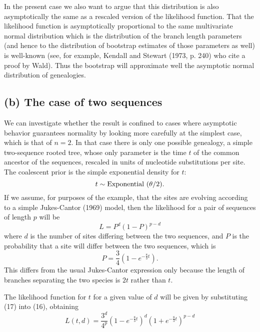 In the present case we also want to argue that this distribution is also
asymptotically the same as a rescaled version of the likelihood function.
That the likelihood function is asymptotically proportional to the same
multivariate normal distribution which is the distribution of the branch length
parameters (and hence to the distribution of bootstrap estimates of those
parameters as well) is well-known (see, for example, Kendall and Stewart
(1973, p. 240) who cite a proof by Wald).  Thus the bootstrap will
approximate well the asymptotic normal distribution of genealogies.

\subsection*{(b) The case of two sequences}

We can investigate whether the result is confined to cases where
asymptotic behavior guarantees normality by looking more carefully
at the simplest case, which is that of $n = 2$.  In that case there is
only one possible genealogy, a simple two-sequence rooted tree, whose
only parameter is the time $t$ of the common ancestor of the sequences,
rescaled in units of nucleotide substitutions per site.
The coalescent prior is the simple exponential density for $t$:
\begin{equation} %
t \sim {\rm Exponential}~(\theta/2).
\end{equation}
If we assume, for purposes of the example, that the sites are evolving
according to a simple Jukes-Cantor (1969) model, then the likelihood for
a pair of sequences of length $p$ will be 
\begin{equation} %
L  =   P^d (1-P)^{p-d}
\end{equation}
where $d$ is the number of sites differing between the two sequences, and
$P$ is the probability that a site will differ between the two sequences,
which is
\begin{equation} %
P = \frac{3}{4}\left(1 - e^{-\frac{8}{3}t}\right).
\end{equation}
This differs from the usual Jukes-Cantor expression only because the
length of branches separating the two species is $2t$ rather than $t$.

The likelihood function for $t$ for a given value of $d$ will be given by
substituting (17) into
(16), obtaining
\begin{equation} %
L(t, d) = \frac{3^d}{4^p}\left(1 - e^{-\frac{8}{3}t}\right)^d\left(1 + e^{-\frac{8}{3}t}\right)^{p-d}
\end{equation}

